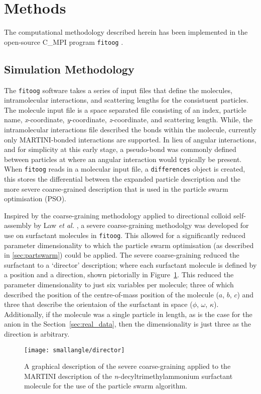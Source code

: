 \section{Methods}

The computational methodology described herein has been implemented in the open-source C\_MPI program \texttt{fitoog} \cite{mccluskey_arm61/fitoog_2019}.

\subsection{Simulation Methodology}

The \texttt{fitoog} software takes a series of input files that define the molecules, intramolecular interactions, and scattering lengths for the consistuent particles.
The molecule input file is a space separated file consisting of an index, particle name, \emph{x}-coordinate, \emph{y}-coordinate, \emph{z}-coordinate, and scattering length.
While, the intramolecular interactions file described the bonds within the molecule, currently only MARTINI-bonded interactions are supported.
In lieu of angular interactions, and for simplicity at this early stage, a pseudo-bond was commonly defined between particles at where an angular interaction would typically be present.
When \texttt{fitoog} reads in a molecular input file, a \texttt{differences} object is created, this stores the differential between the expanded particle description and the more severe coarse-grained description that is used in the particle swarm optimisation (PSO).

Inspired by the coarse-graining methodology applied to directional colloid self-assembly by Law \emph{et al.} \cite{law_coarse-grained_2016}, a severe coarse-graining methodolgy was developed for use on surfactant molecules in \texttt{fitoog}.
This allowed for a significantly reduced parameter dimensionality to which the particle swarm optimisation (as described in \ref{sec:partswarm}) could be applied.
The severe coarse-graining reduced the surfactant to a `director' description; where each surfactant molecule is defined by a position and a direction, shown pictorially in Figure~\ref{fig:director}.
This reduced the parameter dimensionality to just six variables per molecule; three of which described the position of the centre-of-mass position of the molecule ($a$, $b$, $c$) and three that describe the orientaion of the surfactant in space ($\phi$, $\omega$, $\kappa$).
Additionally, if the molecule was a single particle in length, as is the case for the  anion in the Section~\ref{sec:real_data}, then the dimensionality is just three as the direction is arbitrary.
%
\begin{figure}
    \centering
    \texttt{[image: smallangle/director]}
    \caption{A graphical description of the severe coarse-graining applied to the MARTINI description of the \emph{n}-decyltrimethylammonium surfactant molecule for the use of the particle swarm algorithm.}
    \label{fig:director}
\end{figure}
%

